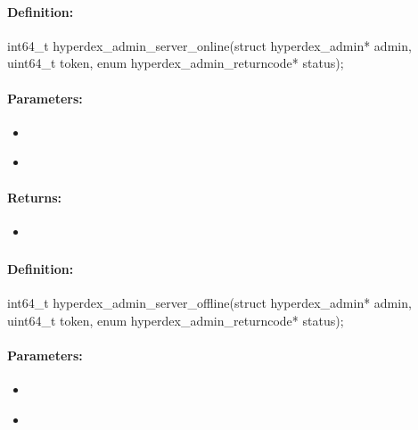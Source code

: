 \paragraph{Definition:}
\begin{ccode}
int64_t hyperdex_admin_server_online(struct hyperdex_admin* admin,
        uint64_t token,
        enum hyperdex_admin_returncode* status);
\end{ccode}

\paragraph{Parameters:}
\begin{itemize}[noitemsep]
\item {}\\

\item {}\\

\end{itemize}

\paragraph{Returns:}
\begin{itemize}[noitemsep]
\item {}\\

\end{itemize}

\pagebreak
\subsubsection{}
\label{api:c:server_offline}


\paragraph{Definition:}
\begin{ccode}
int64_t hyperdex_admin_server_offline(struct hyperdex_admin* admin,
        uint64_t token,
        enum hyperdex_admin_returncode* status);
\end{ccode}

\paragraph{Parameters:}
\begin{itemize}[noitemsep]
\item {}\\

\item {}\\

\end{itemize}

